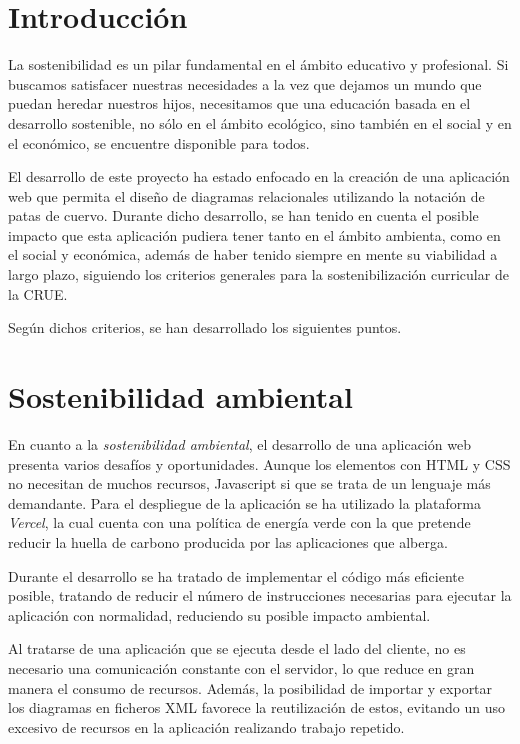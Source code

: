 
\section{Introducción}

La sostenibilidad es un pilar fundamental en el ámbito educativo y profesional. Si buscamos satisfacer nuestras necesidades a la vez que dejamos un mundo que puedan heredar nuestros hijos, necesitamos que una educación basada en el desarrollo sostenible, no sólo en el ámbito ecológico, sino también en el social y en el económico, se encuentre disponible para todos.

El desarrollo de este proyecto ha estado enfocado en la creación de una aplicación web que permita el diseño de diagramas relacionales utilizando la notación de patas de cuervo. Durante dicho desarrollo, se han tenido en cuenta el posible impacto que esta aplicación pudiera tener tanto en el ámbito ambienta, como en el social y económica, además de haber tenido siempre en mente su viabilidad a largo plazo, siguiendo los criterios generales para la sostenibilización curricular de la CRUE\cite{crue:sos-curr}.

Según dichos criterios, se han desarrollado los siguientes puntos.

\section{Sostenibilidad ambiental}

En cuanto a la \emph{sostenibilidad ambiental}, el desarrollo de una aplicación web presenta varios desafíos y oportunidades. Aunque los elementos con HTML y CSS no necesitan de muchos recursos, Javascript si que se trata de un lenguaje más demandante. Para el despliegue de la aplicación se ha utilizado la plataforma \textit{Vercel}, la cual cuenta con una política de energía verde con la que pretende reducir la huella de carbono producida por las aplicaciones que alberga\cite{ver:gr-pol}.

Durante el desarrollo se ha tratado de implementar el código más eficiente posible, tratando de reducir el número de instrucciones necesarias para ejecutar la aplicación con normalidad, reduciendo su posible impacto ambiental.

Al tratarse de una aplicación que se ejecuta desde el lado del cliente, no es necesario una comunicación constante con el servidor, lo que reduce en gran manera el consumo de recursos. Además, la posibilidad de importar y exportar los diagramas en ficheros XML favorece la reutilización de estos, evitando un uso excesivo de recursos en la aplicación realizando trabajo repetido.

